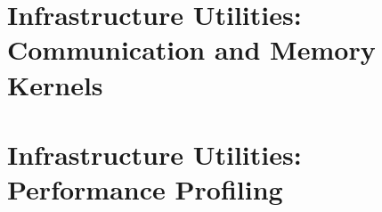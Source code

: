 \documentclass[english]{article}
\newcommand{\shortname}{GR}
\begin{document}
\part{Infrastructure Utilities: Communication and Memory Kernels}
\label{part:Infrastructure_Utilities:_Communication_and_Memory_Kernels}

\setcounter{section}{0}
\renewcommand{\thesection}{\shortname\arabic{section}}
\renewcommand{\thesubsection}{\shortname\arabic{section}.\arabic{subsection}}
\renewcommand{\thesubsubsection}{\shortname\arabic{section}.\arabic{subsection}.\arabic{subsubsection}}





%
\newpage
\begin{htmlonly}
\end{htmlonly}
\part{Infrastructure Utilities: Performance Profiling}
\label{part:Infrastructure_Utilities:_Performance_Profiling}

\setcounter{section}{0}
\renewcommand{\thesection}{\shortname\arabic{section}}
\renewcommand{\thesubsection}{\shortname\arabic{section}.\arabic{subsection}}
\renewcommand{\thesubsubsection}{\shortname\arabic{section}.\arabic{subsection}.\arabic{subsubsection}}
\end{document}
